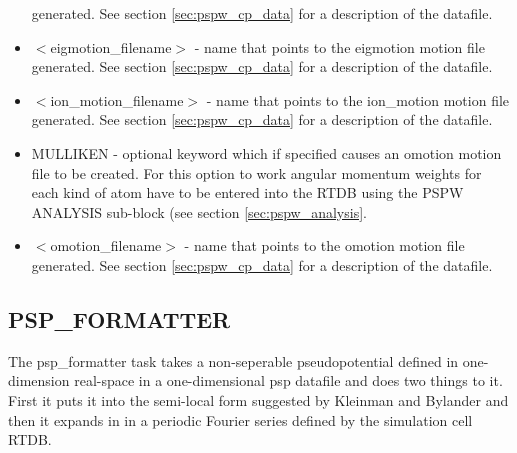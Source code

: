 \begin{itemize}
				generated. See section \ref{sec:pspw_cp_data} for a 
                                description of the datafile.
        \item $<$eigmotion\_filename$>$ - name that points to the eigmotion motion file
				generated. See section \ref{sec:pspw_cp_data} for a 
                                description of the datafile.
        \item $<$ion\_motion\_filename$>$ - name that points to the ion\_motion motion file
				generated. See section \ref{sec:pspw_cp_data} for a 
                                description of the datafile.
       \item MULLIKEN - optional keyword which if specified
                         causes an omotion motion file to be created.  For this option
	                 to work angular momentum weights for each kind
                         of atom have to be entered into the RTDB using
                         the PSPW ANALYSIS sub-block (see section \ref{sec:pspw_analysis}.
        \item $<$omotion\_filename$>$ - name that points to the omotion motion file
				generated. See section \ref{sec:pspw_cp_data} for a 
                                description of the datafile.
\end{itemize}



\subsection{PSP\_FORMATTER}
The psp\_formatter task takes a non-seperable pseudopotential defined in
one-dimension real-space in a one-dimensional psp datafile and does two 
things to it.  First it puts it into the semi-local form suggested by 
Kleinman and Bylander and then it expands in in a periodic Fourier
series defined by the simulation cell RTDB.  

